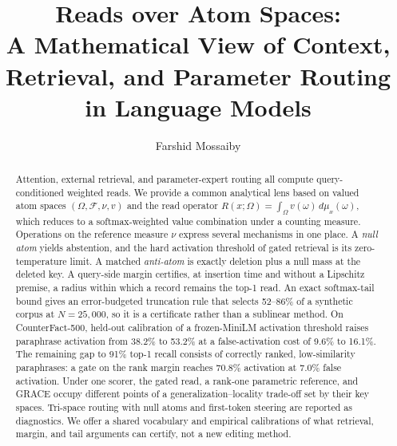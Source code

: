 \documentclass[preprint,12pt]{elsarticle}
\newcommand{\Om}{\Omega}
\begin{document}
\begin{frontmatter}

\title{Reads over Atom Spaces:\\
A Mathematical View of Context, Retrieval, and Parameter Routing in Language Models}

\author[inst1]{Farshid Mossaiby}

\begin{abstract}
Attention, external retrieval, and parameter-expert routing all compute query-conditioned weighted reads. We provide a common analytical lens based on valued atom spaces $(\Om,\mathcal F,\nu,v)$ and the read operator $R(x;\Om)=\int_\Om v(\omega)\,d\mu_x(\omega)$, which reduces to a softmax-weighted value combination under a counting measure. Operations on the reference measure $\nu$ express several mechanisms in one place. A \emph{null atom} yields abstention, and the hard activation threshold of gated retrieval is its zero-temperature limit. A matched \emph{anti-atom} is exactly deletion plus a null mass at the deleted key. A query-side margin certifies, at insertion time and without a Lipschitz premise, a radius within which a record remains the top-1 read. An exact softmax-tail bound gives an error-budgeted truncation rule that selects 52--86\% of a synthetic corpus at $N=25{,}000$, so it is a certificate rather than a sublinear method. On CounterFact-500, held-out calibration of a frozen-MiniLM activation threshold raises paraphrase activation from 38.2\% to 53.2\% at a false-activation cost of 9.6\% to 16.1\%. The remaining gap to 91\% top-1 recall consists of correctly ranked, low-similarity paraphrases: a gate on the rank margin reaches 70.8\% activation at 7.0\% false activation. Under one scorer, the gated read, a rank-one parametric reference, and GRACE occupy different points of a generalization--locality trade-off set by their key spaces. Tri-space routing with null atoms and first-token steering are reported as diagnostics. We offer a shared vocabulary and empirical calibrations of what retrieval, margin, and tail arguments can certify, not a new editing method.
\end{abstract}

\end{frontmatter}
\end{document}
